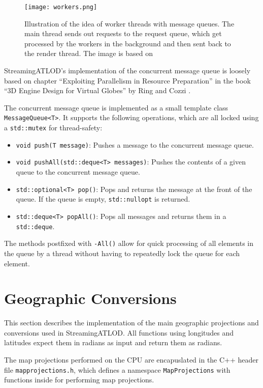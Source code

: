 \begin{figure}[H]
  \centering
  \texttt{[image: workers.png]}
  \caption{Illustration of the idea of worker threads with message queues. The main thread 
  sends out requests to the request queue, which get processed by the workers in the background and 
  then sent back to the render thread. The image is based on \cite[p.~287]{3denginedesignforvirtualglobes}}\label{fig:workers}
\end{figure}

StreamingATLOD's implementation of
the concurrent message queue is loosely based on 
chapter ``Exploiting Parallelism in Resource Preparation'' in 
the book ``3D Engine Design for Virtual Globes'' by Ring and Cozzi \cite[p.~275]{3denginedesignforvirtualglobes}.

The concurrent message queue is implemented as a small template class \texttt{MessageQueue<T>}.
It supports the following operations, which are all locked using a \texttt{std::mutex} for thread-safety:
\begin{itemize}
  \item \texttt{void push(T message)}: Pushes a message to the concurrent message queue.
  \item \texttt{void pushAll(std::deque<T> messages)}: Pushes the contents of a given queue to the concurrent message queue.
  \item \texttt{std::optional<T> pop()}: Pops and returns the message at the front of the queue. If the queue is empty, \texttt{std::nullopt} is returned.
  \item \texttt{std::deque<T> popAll()}: Pops all messages and returns them in a \texttt{std::deque}.
\end{itemize}

The methods postfixed with \texttt{-All()} allow for quick processing of all elements in 
the queue by a thread without having to repeatedly lock the queue for each element. 

\section{Geographic Conversions}
This section describes the implementation of the main geographic projections and conversions
used in StreamingATLOD. All functions using longitudes and latitudes
expect them in radians as input and return them 
as radians.

The map projections performed on the CPU 
are encapuslated in the C++ header file \texttt{mapprojections.h},
which defines a namespace \texttt{MapProjections}
with functions inside for performing map projections.

